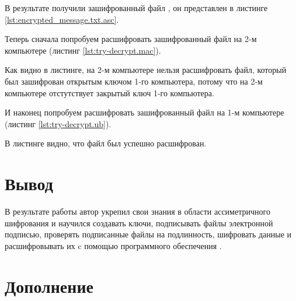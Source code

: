 



В результате получили зашифрованный файл , он представлен в листинге \ref{lst:encrypted_message.txt.asc}.



Теперь сначала попробуем расшифровать зашифрованный файл на 2-м компьютере (листинг \ref{lst:try-decrypt.mac}).



Как видно в листинге, на 2-м компьютере нельзя расшифровать файл, который был зашифрован открытым ключом 1-го компьютера, потому что на 2-м компьютере отстутствует закрытый ключ 1-го компьютера.

И наконец попробуем расшифровать зашифрованный файл на 1-м компьютере (листинг \ref{lst:try-decrypt.ub}).



В листинге видно, что файл был успешно расшифрован.


\section{Вывод}

В результате работы автор укрепил свои знания в области ассиметричного шифрования и научился создавать  ключи, подписывать файлы электронной подписью, проверять подписанные файлы на подлинность, шифровать данные и расшифровывать их c помощью программного обеспечения .

\section{Дополнение}


